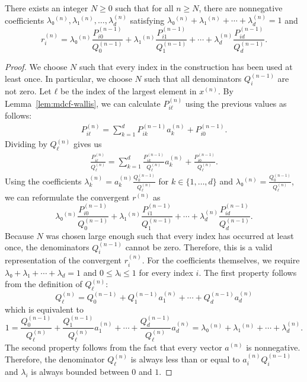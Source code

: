 \begin{lemma}
  \label{lem:conv-conv}
  There exists an integer $N ≥ 0$ such that for all $n ≥ N$,
  there are nonnegative coefficients $λ₀^{(n)}, λ₁^{(n)}, …, λ_d^{(n)}$
  satisfying $λ₀^{(n)} + λ₁^{(n)} + ⋯ + λ_d^{(n)} = 1$ and
  \[
    r_i^{(n)} = λ₀^{(n)} \frac{P_{i0}^{(n-1)}}{Q_0^{(n-1)}} + λ₁^{(n)} \frac{P_{i1}^{(n-1)}}{Q_1^{(n-1)}} + ⋯ + λ_d^{(n)} \frac{P_{id}^{(n-1)}}{Q_d^{(n-1)}}.
  \]
\end{lemma}

\begin{proof}
  We choose $N$ such that every index in the construction has been used at least once.
  In particular, we choose $N$ such that all denominators $Q_i^{(n-1)}$ are not zero.
  Let $ℓ$ be the index of the largest element in $x^{(n)}$.
  By Lemma~\ref{lem:mdcf-wallis}, we can calculate $P_{iℓ}^{(n)}$ using the previous values as follows:
  \begin{align*}
    P_{iℓ}^{(n)} = \sum_{k = 1}^d P_{ik}^{(n-1)} a_k^{(n)} + P_{i0}^{(n-1)}.
  \end{align*}
  Dividing by $Q_ℓ^{(n)}$ gives us
  \begin{align*}
    \frac{P_{iℓ}^{(n)}}{Q_ℓ^{(n)}} = \sum_{k = 1}^d \frac{P_{ik}^{(n-1)}}{Q_ℓ^{(n)}} a_k^{(n)} + \frac{P_{i0}^{(n-1)}}{Q_ℓ^{(n)}}.
  \end{align*}
  Using the coefficients $λ_k^{(n)} = a_k^{(n)} \frac{Q_k^{(n-1)}}{Q_ℓ^{(n)}}$ for $k ∈ \{1, …, d\}$
  and $λ₀^{(n)} = \frac{Q_0^{(n-1)}}{Q_ℓ^{(n)}}$,
  we can reformulate the convergent $r^{(n)}$ as
  \[
    λ₀^{(n)} \frac{P_{i0}^{(n-1)}}{Q_0^{(n-1)}} + λ₁^{(n)} \frac{P_{i1}^{(n-1)}}{Q_1^{(n-1)}} + ⋯ + λ_d^{(n)} \frac{P_{id}^{(n-1)}}{Q_d^{(n-1)}}.
  \]
  Because $N$ was chosen large enough such that every index has occurred at least once,
  the denominators $Q_i^{(n-1)}$ cannot be zero.
  Therefore, this is a valid representation of the convergent $r_i^{(n)}$.
  For the coefficients themselves, we require $λ₀ + λ₁ + ⋯ + λ_d = 1$ and $0 ≤ λᵢ ≤ 1$ for every index $i$.
  The first property follows from the definition of $Q_ℓ^{(n)}$:
  \[
    Q_ℓ^{(n)} = Q_0^{(n-1)} + Q_1^{(n-1)} a_1^{(n)} + ⋯ + Q_d^{(n-1)} a_d^{(n)}
  \]
  which is equivalent to
  \[
    1 = \frac{Q_0^{(n-1)}}{Q_ℓ^{(n)}} + \frac{Q_1^{(n-1)}}{Q_ℓ^{(n)}} a_1^{(n)} + ⋯ + \frac{Q_d^{(n-1)}}{Q_ℓ^{(n)}} a_d^{(n)} = λ₀^{(n)} + λ₁^{(n)} + ⋯ + λ_d^{(n)}.
  \]
  The second property follows from the fact that every vector $a^{(n)}$ is nonnegative.
  Therefore, the denominator $Q_ℓ^{(n)}$ is always less than or equal to $a_i^{(n)} Q_i^{(n-1)}$ and
  $λ_i$ is always bounded between $0$ and $1$.
\end{proof}


